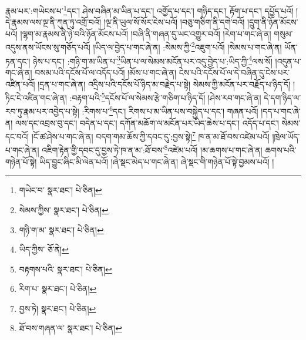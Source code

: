 རྣམ་པར་:གཡེངས་པ་\footnote{གཡེང་བ་  སྣར་ཐང་།  པེ་ཅིན། }དང་། ཤེས་བཞིན་མ་ཡིན་པ་དང་། འགྱོད་པ་དང་། གཉིད་དང་། རྟོག་པ་དང་། དཔྱོད་པའོ། །དེ་རྣམས་ལས་ལྔ་ནི་ཀུན་ཏུ་འགྲོ་བའོ། །ལྔ་ནི་ཡུལ་སོ་སོར་ངེས་པའོ། །བཅུ་གཅིག་ནི་དགེ་བའོ། །དྲུག་ནི་ཉོན་མོངས་པའོ། །ལྷག་མ་རྣམས་ནི་ཉེ་བའི་ཉོན་མོངས་པའོ། །བཞི་ནི་གཞན་དུ་ཡང་འགྱུར་བའོ། །རེག་པ་གང་ཞེ་ན། གསུམ་འདུས་ནས་ཡོངས་སུ་གཅོད་པའོ། །ཡིད་ལ་བྱེད་པ་གང་ཞེ་ན། :སེམས་ཀྱི་\footnote{སེམས་ཀྱིས་  སྣར་ཐང་།  པེ་ཅིན། }འཇུག་པའོ། །སེམས་པ་གང་ཞེ་ན། ཡོན་ཏན་དང་། ཉེས་པ་དང་། :གཉི་ག་མ་ཡིན་པ་\footnote{གཉི་ག་མ་  སྣར་ཐང་།  པེ་ཅིན། }ཡིན་པ་ལ་སེམས་མངོན་པར་འདུ་བྱེད་པ་:ཡིད་ཀྱི་\footnote{ཡིད་ཀྱིས་  ཅོ་ནེ། }ལས་སོ། །འདུན་པ་གང་ཞེ་ན། བསམ་པའི་དངོས་པོ་ལ་འདོད་པའོ། །མོས་པ་གང་ཞེ་ན། ངེས་པའི་དངོས་པོ་ལ་དེ་བཞིན་དུ་ངེས་པར་འཛིན་པའོ། །དྲན་པ་གང་ཞེ་ན། འདྲིས་པའི་དངོས་པོ་ཉིད་མ་བརྗེད་པ་སྟེ། སེམས་ཀྱི་མངོན་པར་བརྗོད་པ་ཉིད་དོ། །ཏིང་ངེ་འཛིན་གང་ཞེ་ན། :བརྟག་པའི་\footnote{བརྟགས་པའི་  སྣར་ཐང་།  པེ་ཅིན། }དངོས་པོ་ལ་སེམས་རྩེ་གཅིག་པ་ཉིད་དོ། །ཤེས་རབ་གང་ཞེ་ན། དེ་དག་ཉིད་ལ་རབ་ཏུ་རྣམ་པར་འབྱེད་པ་སྟེ། :རིགས་པ་\footnote{རིག་པ་  སྣར་ཐང་།  པེ་ཅིན། }དང་། རིགས་པ་མ་ཡིན་པས་བསྐྱེད་པ་དང་། གཞན་པའོ། །དད་པ་གང་ཞེ་ན། ལས་དང་འབྲས་བུ་དང་། བདེན་པ་དང་། དཀོན་མཆོག་ལ་མངོན་པར་ཡིད་ཆེས་པ་དང་། འདོད་པ་དང་། སེམས་དང་བའོ། །ངོ་ཚ་ཤེས་པ་གང་ཞེ་ན། བདག་གམ་ཆོས་ཀྱི་དབང་དུ་:བྱས་སྟེ།\footnote{བྱས་ཏེ།  སྣར་ཐང་།  པེ་ཅིན། } ཁ་ན་མ་ཐོ་བས་འཛེམ་པའོ། །ཁྲེལ་ཡོད་པ་གང་ཞེ་ན། འཇིག་རྟེན་གྱི་དབང་དུ་བྱས་ཏེ་ཁ་ན་མ་:ཐོ་བས་\footnote{ཐོ་བས་གཞན་ལ་  སྣར་ཐང་།  པེ་ཅིན། }འཛེམ་པའོ། །མ་ཆགས་པ་གང་ཞེ་ན། ཆགས་པའི་གཉེན་པོ་སྟེ། ཡིད་བྱུང་ཞིང་མི་ལེན་པའོ། །ཞེ་སྡང་མེད་པ་གང་ཞེ་ན། ཞེ་སྡང་གི་གཉེན་པོ་སྟེ་བྱམས་པའོ། །
